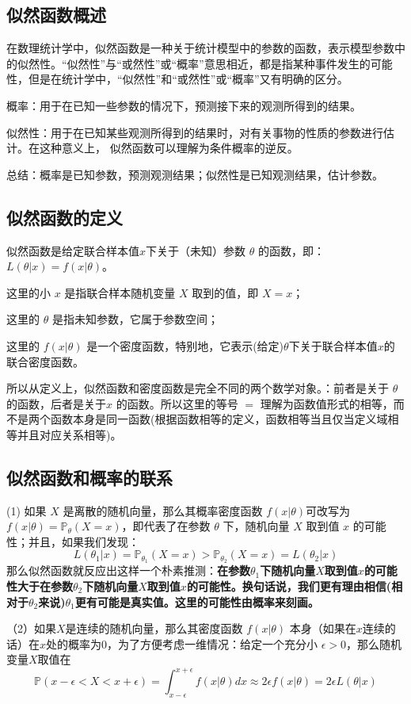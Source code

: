 \documentclass[12pt]{article}
\begin{document}
\subsection{似然函数概述}
在数理统计学中，似然函数是一种关于统计模型中的参数的函数，表示模型参数中的似然性。“似然性”与“或然性”或“概率”意思相近，都是指某种事件发生的可能性，但是在统计学中，“似然性”和“或然性”或“概率”又有明确的区分。

概率：用于在已知一些参数的情况下，预测接下来的观测所得到的结果。

似然性：用于在已知某些观测所得到的结果时，对有关事物的性质的参数进行估计。在这种意义上，{\color{red} 似然函数可以理解为条件概率的逆反。}

{\color{red} 总结：概率是已知参数，预测观测结果；似然性是已知观测结果，估计参数。}

\subsection{似然函数的定义\cite{Zhihu-likelihood}}
似然函数是给定联合样本值$x$下关于（未知）参数 $\theta$ 的函数，即：$L(\theta|x) = f(x|\theta)$。

这里的小 $x$ 是指联合样本随机变量 $X$ 取到的值，即 $X = x$；

这里的 $\theta$ 是指未知参数，它属于参数空间；

这里的 $f(x|\theta)$ 是一个密度函数，特别地，它表示(给定)$\theta$下关于联合样本值$x$的联合密度函数。

所以从定义上，似然函数和密度函数是完全不同的两个数学对象。：前者是关于 $\theta$ 的函数，后者是关于$x$ 的函数。所以这里的等号 $=$ 理解为函数值形式的相等，而不是两个函数本身是同一函数(根据函数相等的定义，函数相等当且仅当定义域相等并且对应关系相等)。

\subsection{\color{red}似然函数和概率的联系}
(1) 如果 $X$ 是离散的随机向量，那么其概率密度函数 $f(x|\theta)$可改写为 $f(x|\theta) = \mathbb{P}_{\theta}(X=x)$，即代表了在参数 $\theta$ 下，随机向量 $X$ 取到值 $x$ 的可能性；并且，如果我们发现：
$$ L(\theta_1|x) = \mathbb{P}_{\theta_1}(X=x) > \mathbb{P}_{\theta_2}(X=x) = L(\theta_2|x)  $$
那么似然函数就反应出这样一个朴素推测：\textbf{在参数$\theta_1$下随机向量$X$取到值$x$的可能性大于在参数$\theta_2$下随机向量$X$取到值$x$的可能性。换句话说，我们更有理由相信(相对于$\theta_2$来说)$\theta_1$更有可能是真实值。这里的可能性由概率来刻画。}

（2）如果$X$是连续的随机向量，那么其密度函数 $f(x|\theta)$ 本身（如果在$x$连续的话）在$x$处的概率为0，为了方便考虑一维情况：给定一个充分小 $\epsilon > 0$，那么随机变量$X$取值在 
$$ \mathbb{P}(x-\epsilon < X < x+\epsilon) = \int_{x-\epsilon}^{x+\epsilon}f(x|\theta)dx \approx 2\epsilon f(x|\theta) = 2\epsilon L(\theta|x)$$
\end{document}
